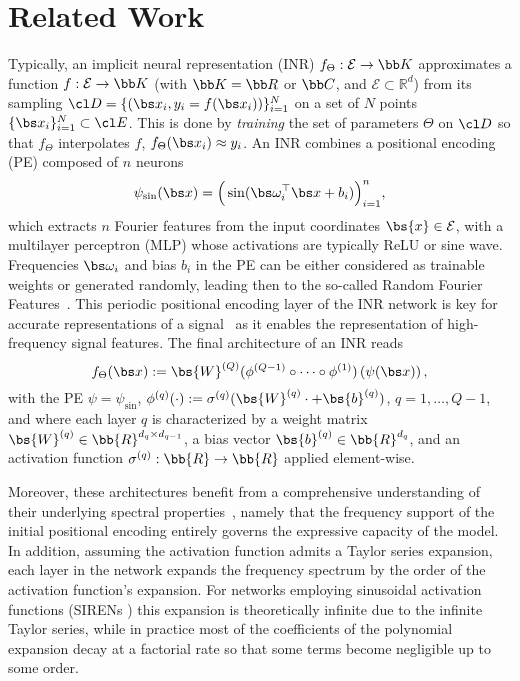 \documentclass[conference]{IEEEtran}
\begin{document}
\section{Related Work}
\label{sec:related_work}
Typically, an implicit neural representation (INR) $f_\Theta: \mathcal{E} \to \bb K$ approximates a function \( f : \mathcal{E} \to \bb K \) (with $\bb K = \bb R$ or $\bb C$, and \(\mathcal{E} \subset \mathbb{R}^d\)) from its sampling $\cl D = \{(\bs x_i, y_i = f(\bs x_i))\}_{i=1}^N$ on a set of $N$ points $\{\bs x_i\}_{i=1}^N \subset \cl E$. This is done by \emph{training} the set of parameters $\Theta$ on $\cl D$ so that $f_\Theta$ interpolates $f$, \ie $f_\Theta(\bs x_i) \approx y_i$. An INR combines a positional encoding (PE) composed of $n$ neurons
\begin{equation}
\label{eq:PE-Euclidean-INR}
\psi_{\sin}(\bs x) = \Big(\sin(\bs \omega_i^\top \bs x + b_i)\Big)_{i=1}^n,    
\end{equation}
which extracts $n$ Fourier features from the input coordinates \(\bs{x} \in \mathcal{E}\), with a multilayer perceptron (MLP) whose activations are typically ReLU or sine wave.  Frequencies $\bs \omega_i$ and bias $b_i$ in the PE can be either considered as trainable weights 
or generated randomly, leading then to the so-called Random Fourier Features~\cite{Rahimi2007RandomFF}.
This periodic positional encoding layer of the INR network is key for accurate representations of a signal~\cite{tancik_fourier_2020} as it enables the representation of high-frequency signal features. 
The final architecture of an INR reads
\begin{equation}
\label{eq:INR}
f_{\Theta}(\bs x) := \bs{W}^{(Q)} (\phi^{(Q-1)}\circ \cdots \circ \phi^{(1)})\left(\psi(\bs x)\right),
\end{equation}
with the PE $\psi = \psi_{\sin}$, $\phi^{(q)}(\cdot) := \sigma^{(q)} (\bs{W}^{(q)} \cdot + \bs{b}^{(q)})$, $q=1,\ldots,Q-1$, and where each layer \( q \) is characterized by a weight matrix \( \bs{W}^{(q)} \in \bb{R}^{d_{q} \times d_{q-1}} \), a bias vector \( \bs{b}^{(q)} \in \bb{R}^{d_q} \), and an activation function \( \sigma^{(q)}: \bb{R} \rightarrow \bb{R} \) applied element-wise. 

Moreover, these architectures benefit from a comprehensive understanding of their underlying spectral properties~\cite{yuce2022structureddictionaryperspectiveimplicit}, namely that the frequency support of the initial positional encoding entirely governs the expressive capacity of the model. 
In addition, assuming the activation function admits a Taylor series expansion, 
each layer in the network expands the frequency spectrum by the order of the activation function’s expansion. For networks employing sinusoidal activation functions (\eg SIRENs \cite{sitzmann2020implicitneuralrepresentationsperiodic}) this expansion is theoretically infinite due to the infinite Taylor series, while in practice most of the coefficients of the polynomial expansion decay at a factorial rate so that some terms become negligible up to some order.   
\end{document}
